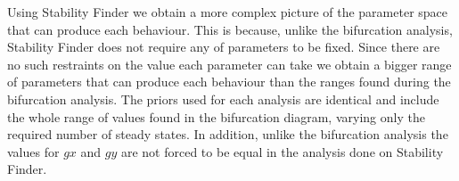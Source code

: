 Using Stability Finder we obtain a more complex picture of the parameter space that can produce each behaviour. This is because, unlike the bifurcation analysis, Stability Finder does not require any of parameters to be fixed. Since there are no such restraints on the value each parameter can take we obtain a bigger range of parameters that can produce each behaviour than the ranges found during the bifurcation analysis. The priors used for each analysis are identical and include the whole range of values found in the bifurcation diagram, varying only the required number of steady states. In addition, unlike the bifurcation analysis the values for $gx$ and $gy$ are not forced to be equal in the analysis done on Stability Finder.





